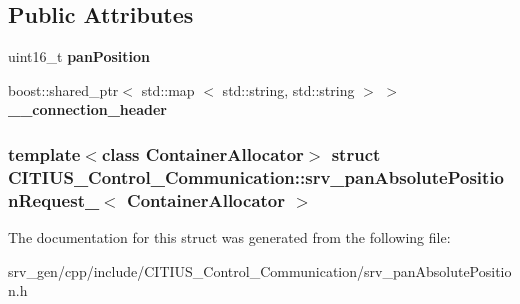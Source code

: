\subsection*{\-Public \-Attributes}
\begin{DoxyCompactItemize}
\item 
\hypertarget{struct_c_i_t_i_u_s___control___communication_1_1srv__pan_absolute_position_request___a3eba736a78a19b428f847f0beda4d433}{uint16\-\_\-t {\bfseries pan\-Position}}\label{struct_c_i_t_i_u_s___control___communication_1_1srv__pan_absolute_position_request___a3eba736a78a19b428f847f0beda4d433}

\item 
\hypertarget{struct_c_i_t_i_u_s___control___communication_1_1srv__pan_absolute_position_request___ae2c21a2d5b77e45282d0406cd827797c}{boost\-::shared\-\_\-ptr$<$ std\-::map\*
$<$ std\-::string, std\-::string $>$ $>$ {\bfseries \-\_\-\-\_\-connection\-\_\-header}}\label{struct_c_i_t_i_u_s___control___communication_1_1srv__pan_absolute_position_request___ae2c21a2d5b77e45282d0406cd827797c}

\end{DoxyCompactItemize}
\subsubsection*{template$<$class Container\-Allocator$>$ struct C\-I\-T\-I\-U\-S\-\_\-\-Control\-\_\-\-Communication\-::srv\-\_\-pan\-Absolute\-Position\-Request\-\_\-$<$ Container\-Allocator $>$}



\-The documentation for this struct was generated from the following file\-:\begin{DoxyCompactItemize}
\item 
srv\-\_\-gen/cpp/include/\-C\-I\-T\-I\-U\-S\-\_\-\-Control\-\_\-\-Communication/srv\-\_\-pan\-Absolute\-Position.\-h\end{DoxyCompactItemize}
